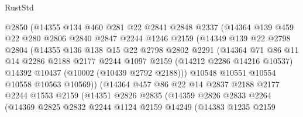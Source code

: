 \begin{lexlean}{RustStd}
\begin{coremodule}
                  @2850
                  (@14355
                    @134
                    @460
                    @281
                    @22
                    @2841
                    @2848
                    @2337
                    (@14364
                      @139
                      @459
                      @22
                      @280
                      @2806
                      @2840
                      @2847
                      @2244
                      @1246
                      @2159
                      (@14349
                        @139
                        @22
                        @2798
                        @2804
                        (@14355
                          @136
                          @138
                          @15
                          @22
                          @2798
                          @2802
                          @2291
                          (@14364
                            @71
                            @86
                            @11
                            @14
                            @2286
                            @2188
                            @2177
                            @2244
                            @1097
                            @2159
                            (@14212 @2286 @14216 @10537)
                            @14392
                            @10437
                            (@10002 (@10439 @2792 @2188)))
                          @10548
                          @10551
                          @10554
                          @10558
                          @10563
                          @10569))
                      (@14364
                        @457
                        @86
                        @22
                        @14
                        @2837
                        @2188
                        @2177
                        @2244
                        @1553
                        @2159
                        (@14351
                          @2826
                          @2835
                          (@14359
                            @2826
                            @2833
                            @2264
                            (@14369
                              @2825
                              @2832
                              @2244
                              @1124
                              @2159
                              @14249
                              (@14383
                                @1235
                                @2159

\end{coremodule}
\end{lexlean}
